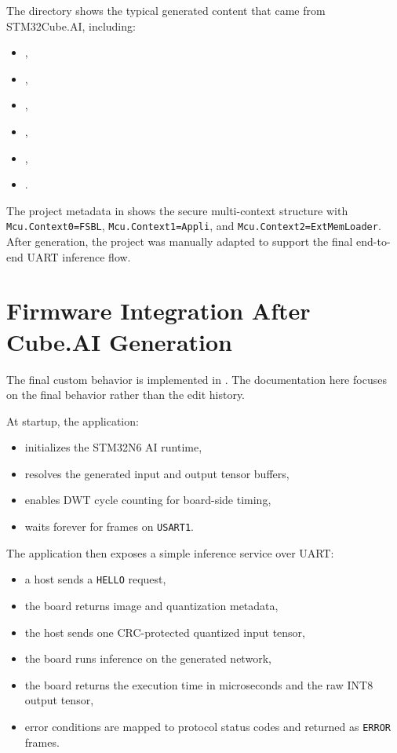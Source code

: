 \documentclass[11pt,a4paper]{article}
\begin{document}
The  directory shows the typical generated content that came from
STM32Cube.AI, including:

\begin{itemize}
\item {},
\item {},
\item {},
\item {},
\item {},
\item {}.
\end{itemize}

The project metadata in 
shows the secure multi-context structure with \texttt{Mcu.Context0=FSBL},
\texttt{Mcu.Context1=Appli}, and \texttt{Mcu.Context2=ExtMemLoader}. After generation,
the project was manually adapted to support the final end-to-end UART inference flow.

\section{Firmware Integration After Cube.AI Generation}

The final custom behavior is implemented in
. The documentation here focuses on
the final behavior rather than the edit history.

At startup, the application:

\begin{itemize}
\item initializes the STM32N6 AI runtime,
\item resolves the generated input and output tensor buffers,
\item enables DWT cycle counting for board-side timing,
\item waits forever for frames on \texttt{USART1}.
\end{itemize}

The application then exposes a simple inference service over UART:

\begin{itemize}
\item a host sends a \texttt{HELLO} request,
\item the board returns image and quantization metadata,
\item the host sends one CRC-protected quantized input tensor,
\item the board runs inference on the generated network,
\item the board returns the execution time in microseconds and the raw INT8 output tensor,
\item error conditions are mapped to protocol status codes and returned as \texttt{ERROR}
      frames.
\end{itemize}
\end{document}
